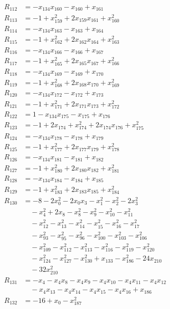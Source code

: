 \begin{align*}
R_{112}&=-x_{134}x_{160}-x_{160}+x_{161}\\
R_{113}&=-1+x_{159}^{2}+2x_{159}x_{161}+x_{160}^{2}\\
R_{114}&=-x_{134}x_{163}-x_{163}+x_{164}\\
R_{115}&=-1+x_{162}^{2}+2x_{162}x_{164}+x_{163}^{2}\\
R_{116}&=-x_{134}x_{166}-x_{166}+x_{167}\\
R_{117}&=-1+x_{165}^{2}+2x_{165}x_{167}+x_{166}^{2}\\
R_{118}&=-x_{134}x_{169}-x_{169}+x_{170}\\
R_{119}&=-1+x_{168}^{2}+2x_{168}x_{170}+x_{169}^{2}\\
R_{120}&=-x_{134}x_{172}-x_{172}+x_{173}\\
R_{121}&=-1+x_{171}^{2}+2x_{171}x_{173}+x_{172}^{2}\\
R_{122}&=1-x_{134}x_{175}-x_{175}+x_{176}\\
R_{123}&=-1+2x_{174}+x_{174}^{2}+2x_{174}x_{176}+x_{175}^{2}\\
R_{124}&=-x_{134}x_{178}-x_{178}+x_{179}\\
R_{125}&=-1+x_{177}^{2}+2x_{177}x_{179}+x_{178}^{2}\\
R_{126}&=-x_{134}x_{181}-x_{181}+x_{182}\\
R_{127}&=-1+x_{180}^{2}+2x_{180}x_{182}+x_{181}^{2}\\
R_{128}&=-x_{134}x_{184}-x_{184}+x_{185}\\
R_{129}&=-1+x_{183}^{2}+2x_{183}x_{185}+x_{184}^{2}\\
R_{130}&=-8-2x_{0}^{2}-2x_{0}x_{3}-x_{1}^{2}-x_{2}^{2}-2x_{3}^{2}\\
&\quad{}-x_{4}^{2}+2x_{8}-x_{8}^{2}-x_{9}^{2}-x_{10}^{2}-x_{11}^{2}\\
&\quad{}-x_{12}^{2}-x_{13}^{2}-x_{14}^{2}-x_{15}^{2}-x_{16}^{2}-x_{17}^{2}\\
&\quad{}-x_{93}^{2}-x_{95}^{2}-x_{96}^{2}-x_{100}^{2}-x_{103}^{2}-x_{106}^{2}\\
&\quad{}-x_{109}^{2}-x_{112}^{2}-x_{113}^{2}-x_{116}^{2}-x_{119}^{2}-x_{120}^{2}\\
&\quad{}-x_{124}^{2}-x_{127}^{2}-x_{130}^{2}+x_{133}-x_{186}^{2}-24x_{210}\\
&\quad{}-32x_{210}^{2}\\
R_{131}&=-x_{4}-x_{4}x_{8}-x_{4}x_{9}-x_{4}x_{10}-x_{4}x_{11}-x_{4}x_{12}\\
&\quad{}-x_{4}x_{13}-x_{4}x_{14}-x_{4}x_{15}-x_{4}x_{16}+x_{186}\\
R_{132}&=-16+x_{0}-x_{187}^{2}\\

\end{align*}
